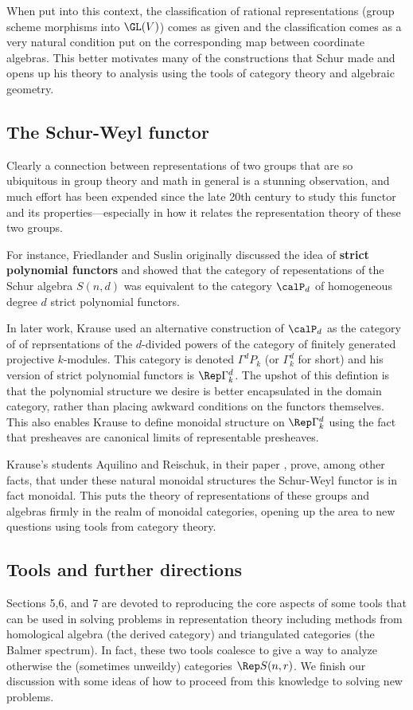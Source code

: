 \documentclass[12pt]{article}
\begin{document}
When put into this context, the classification of rational representations (group scheme morphisms into $\GL(V)$) comes as given and the classification comes as a very 
natural condition put on the corresponding map between coordinate algebras. This better motivates many of the constructions 
that Schur made and opens up his theory to analysis using the tools of category theory and algebraic geometry.

\subsection{The Schur-Weyl functor}
Clearly a connection between representations of two groups that are so ubiquitous in group theory and math in general 
is a stunning observation, and much effort has been expended since the late 20th century to study this functor and its 
properties---especially in how it relates the representation theory of these two groups. 

For instance, Friedlander and Suslin \cite{friedlander-suslin}
originally discussed the idea of \textbf{strict polynomial functors} and showed that the category of repesentations 
of the Schur algebra $S(n,d)$ was equivalent to the category $\calP_d$ of homogeneous degree $d$ strict polynomial functors.

In later work, Krause \cite{krause-strict-poly-func} used an alternative construction of $\calP_d$ as the category of
of reprsentations of the $d$-divided powers of the category of finitely generated projective $k$-modules. This category is 
denoted $\Gamma^d P_k$ (or $\Gamma^d_k$ for short) and his version of strict polynomial functors is $\Rep \Gamma^d_k$. The upshot of this defintion is that 
the polynomial structure we desire is better encapsulated in the domain category, rather than placing awkward conditions on the functors themselves.
This also enables Krause to define monoidal structure on $\Rep \Gamma^d_k$ using the fact that presheaves are canonical limits of representable presheaves. 

Krause's students Aquilino and Reischuk, in their paper \cite{aquilino-reischuk}, prove, among other facts, that 
under these natural monoidal structures the Schur-Weyl functor is in fact monoidal. This puts the theory of representations 
of these groups and algebras firmly in the realm of monoidal categories, opening up the area to new questions using 
tools from category theory.

\subsection{Tools and further directions}
Sections 5,6, and 7 are devoted to reproducing the core aspects of some tools that can be used in solving problems in representation theory
including methods from homological algebra (the derived category) and triangulated categories (the Balmer spectrum). In fact, these two 
tools coalesce to give a way to analyze otherwise the (sometimes unweildy) categories $\Rep S(n,r)$. We finish our discussion with some ideas 
of how to proceed from this knowledge to solving new problems.
\end{document}
